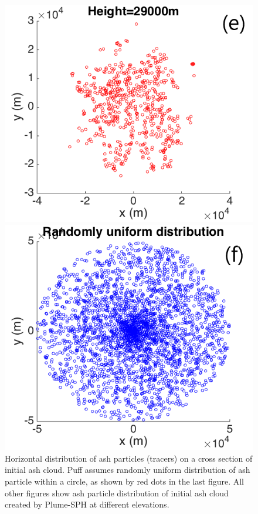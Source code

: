 \documentclass[draft,linenumbers]{agujournal2019}
\begin{document}
\begin{figure}[!htb]
\begin{minipage}{.325 \textwidth}
    \end{minipage}%
    \begin{minipage}{.325 \textwidth}
        \centering
        \includegraphics[width=0.99 \textwidth]{Figures/Possion-H29km-ParticleDis-h}
    \end{minipage}%
    \begin{minipage}{.325 \textwidth}
        \centering
        \includegraphics[width=0.99 \textwidth]{Figures/Possion-RDU-ParticleDis-h}
    \end{minipage}%
    \caption{Horizontal distribution of ash particles (tracers) on a cross section of initial ash cloud. Puff assumes randomly uniform distribution of ash particle within a circle, as shown by red dots in the last figure. All other figures show ash particle distribution of initial ash cloud created by Plume-SPH at different elevations.}
    \label{fig:initial-cloud-horizontal}
\end{figure}
\end{document}
